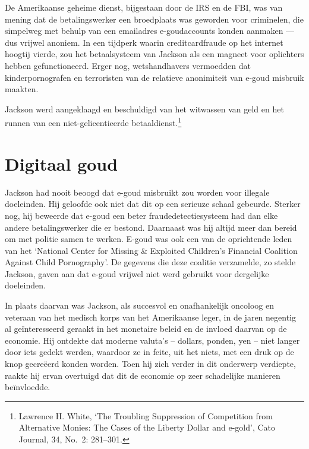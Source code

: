 \documentclass[
  a5paper,
  smalldemyvopaper,11pt,twoside,onecolumn,openright,extrafontsizes]{memoir}
\begin{document}
De Amerikaanse geheime dienst, bijgestaan door de IRS en de FBI, was van
mening dat de betalingswerker een broedplaats was geworden voor
criminelen, die simpelweg met behulp van een emailadres e-goudaccounts
konden aanmaken --- dus vrijwel anoniem. In een tijdperk waarin
creditcardfraude op het internet hoogtij vierde, zou het betaalsysteem
van Jackson als een magneet voor oplichters hebben gefunctioneerd. Erger
nog, wetshandhavers vermoedden dat kinderpornografen en terroristen van
de relatieve anonimiteit van e-goud misbruik maakten.

Jackson werd aangeklaagd en beschuldigd van het witwassen van geld en
het runnen van een niet-gelicentieerde betaaldienst.\footnote{\hspace{0pt}Lawrence
  H. White, `The Troubling Suppression of Competition from Alternative
  Monies: The Cases of the Liberty Dollar and e-gold', Cato Journal, 34,
  No.~2: 281--301.}

\section*{Digitaal goud}\label{digitaal-goud}


Jackson had nooit beoogd dat e-goud misbruikt zou worden voor illegale
doeleinden. Hij geloofde ook niet dat dit op een serieuze schaal
gebeurde. Sterker nog, hij beweerde dat e-goud een beter
fraudedetectiesysteem had dan elke andere betalingswerker die er
bestond. Daarnaast was hij altijd meer dan bereid om met politie samen
te werken. E-goud was ook een van de oprichtende leden van het `National
Center for Missing \& Exploited Children's Financial Coalition Against
Child Pornography'. De gegevens die deze coalitie verzamelde, zo stelde
Jackson, gaven aan dat e-goud vrijwel niet werd gebruikt voor dergelijke
doeleinden.

In plaats daarvan was Jackson, als succesvol en onafhankelijk oncoloog
en veteraan van het medisch korps van het Amerikaanse leger, in de jaren
negentig al geïnteresseerd geraakt in het monetaire beleid en de invloed
daarvan op de economie. Hij ontdekte dat moderne valuta's -- dollars,
ponden, yen -- niet langer door iets gedekt werden, waardoor ze in
feite, uit het niets, met een druk op de knop gecreëerd konden worden.
Toen hij zich verder in dit onderwerp verdiepte, raakte hij ervan
overtuigd dat dit de economie op zeer schadelijke manieren beïnvloedde.
\end{document}
